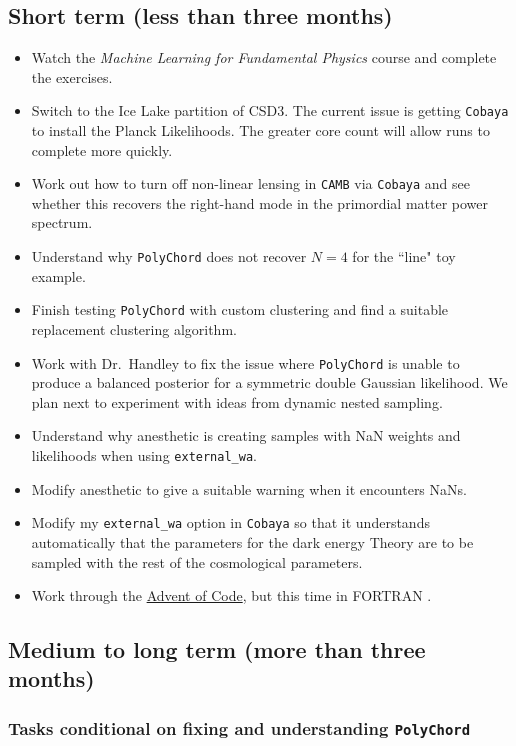 \documentclass{article}
\begin{document}
\subsection{Short term (less than three months)}
\begin{itemize}
  \item Watch the \textit{Machine Learning for Fundamental Physics} course and complete the exercises.
  \item Switch to the Ice Lake partition of CSD3. The current issue is getting \texttt{Cobaya} to install the Planck Likelihoods. The greater core count will allow runs to complete more quickly.
  \item Work out how to turn off non-linear lensing in \texttt{CAMB} via \texttt{Cobaya} and see whether this recovers the right-hand mode in the primordial matter power spectrum. 
  \item Understand why \texttt{PolyChord} does not recover $N=4$ for the ``line" toy example.
  \item Finish testing \texttt{PolyChord} with custom clustering and find a suitable replacement clustering algorithm.
  \item Work with Dr.~Handley to fix the issue where \texttt{PolyChord} is unable to produce a balanced posterior for a symmetric double Gaussian likelihood. We plan next to experiment with ideas from dynamic nested sampling.
  \item Understand why anesthetic is creating samples with NaN weights and likelihoods when using \newline \texttt{external\_wa}.
  \item Modify anesthetic to give a suitable warning when it encounters NaNs.
  \item Modify my \texttt{external\_wa} option in \texttt{Cobaya} so that it understands automatically that the parameters for the dark energy Theory are to be sampled with the rest of the cosmological parameters.
  \item Work through the \href{https://adventofcode.com}{Advent of Code}, but this time in FORTRAN \cite{advent}.
\end{itemize}
\subsection{Medium to long term (more than three months)}

\subsubsection{Tasks conditional on fixing and understanding \texttt{PolyChord}}
\end{document}

